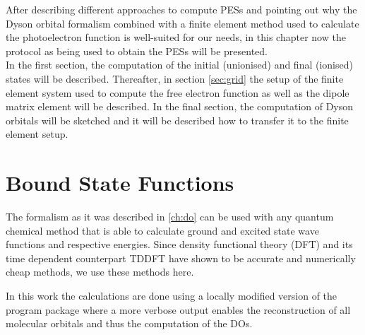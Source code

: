 After describing different approaches to compute PESs and pointing out why the Dyson orbital formalism combined with a finite element method used to calculate the photoelectron function is well-suited for our needs, in this chapter now
the protocol as being used to obtain the PESs will be presented.\\
In the first section, the computation of the initial (unionised) and final (ionised) states will be described.
Thereafter, in section \ref{sec:grid} the setup of the finite element system used to compute the free electron function as well as the dipole matrix element will be described.
In the final section, the computation of Dyson orbitals will be sketched and it will be described how to transfer it to the finite element setup.

\section{Bound State Functions}
The formalism as it was described in \ref{ch:do} can be used with any quantum chemical method that is able to calculate ground and excited state wave functions and respective energies.
Since density functional theory (DFT) and its time dependent counterpart TDDFT have shown to be accurate and numerically cheap methods, we use these methods here.

In this work the calculations are done using a locally modified version of the program package  \cite{nwchem} where a more verbose output enables the reconstruction of all molecular orbitals and thus the computation of the DOs.

